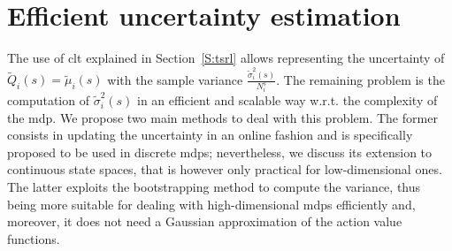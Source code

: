 \section{Efficient uncertainty estimation}\label{S:uncertainty}
The use of \gls{clt} explained in Section~\ref{S:tsrl} allows representing the uncertainty of $\tilde{Q}_i(s) = \tilde{\mu}_i(s)$ with the sample variance $\frac{\tilde{\sigma}^2_i(s)}{N_i^s}$. The remaining problem is the computation of $\tilde{\sigma}^2_i(s)$ in an efficient and scalable way w.r.t. the complexity of the \gls{mdp}. We propose two main methods to deal with this problem. The former consists in updating the uncertainty in an online fashion and is specifically proposed to be used in discrete \glspl{mdp}; nevertheless, we discuss its extension to continuous state spaces, that is however only practical for low-dimensional ones. The latter exploits the bootstrapping method to compute the variance, thus being more suitable for dealing with high-dimensional \glspl{mdp} efficiently and, moreover, it does not need a Gaussian approximation of the action value functions.

